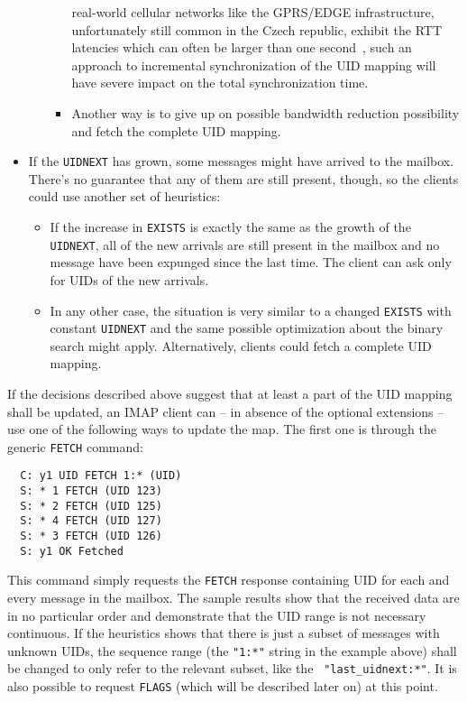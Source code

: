 \documentclass[trojita]{subfiles}
\begin{document}
\begin{itemize}
\begin{itemize}
\begin{itemize}
            real-world cellular networks like the GPRS/EDGE infrastructure, unfortunately still common in the Czech
            republic, exhibit the RTT latencies which can often be larger than one second~\cite{gprs-rtt-report}, such
            an approach to incremental synchronization of the UID mapping will have severe impact on the total
            synchronization time.
          \item Another way is to give up on possible bandwidth reduction possibility and fetch the complete UID
            mapping.
        \end{itemize}
    \end{itemize}
  \item If the {\tt UIDNEXT} has grown, some messages might have arrived to the mailbox.  There's no guarantee that any
    of them are still present, though, so the clients could use another set of heuristics:
    \begin{itemize}
      \item If the increase in {\tt EXISTS} is exactly the same as the growth of the {\tt UIDNEXT}, all of the new
        arrivals are still present in the mailbox and no message have been expunged since the last time.  The client can
        ask only for UIDs of the new arrivals.
      \item In any other case, the situation is very similar to a changed {\tt EXISTS} with constant {\tt UIDNEXT} and
        the same possible optimization about the binary search might apply.  Alternatively, clients could fetch a
        complete UID mapping.
    \end{itemize}
\end{itemize}

If the decisions described above suggest that at least a part of the UID mapping shall be updated, an IMAP client can --
in absence of the optional extensions -- use one of the following ways to update the map.  The first one is through the
generic {\tt FETCH} command:

\begin{verbatim}
  C: y1 UID FETCH 1:* (UID)
  S: * 1 FETCH (UID 123)
  S: * 2 FETCH (UID 125)
  S: * 4 FETCH (UID 127)
  S: * 3 FETCH (UID 126)
  S: y1 OK Fetched
\end{verbatim}

This command simply requests the {\tt FETCH} response containing UID for each and every message in the mailbox.  The
sample results show that the received data are in no particular order and demonstrate that the UID range is not
necessary continuous.  If the heuristics shows that there is just a subset of messages with unknown UIDs, the sequence
range (the {\tt "1:*"} string in the example above) shall be changed to only refer to the relevant subset, like the {\tt
"last\_uidnext:*"}.  It is also possible to request {\tt FLAGS} (which will be described later on) at this point.
\end{document}
